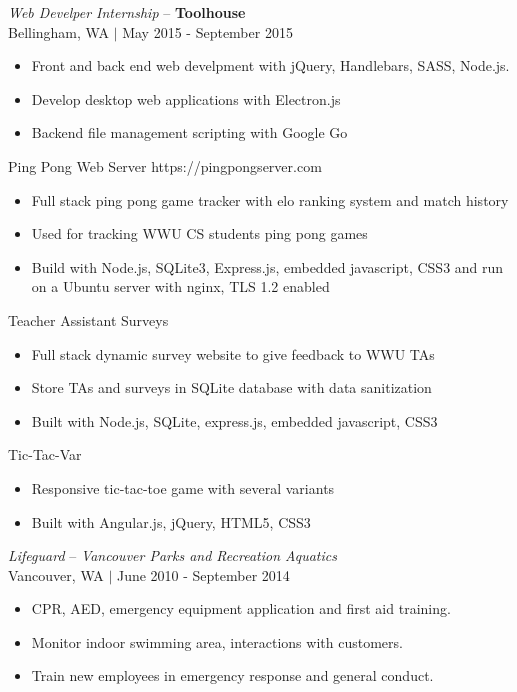 \documentclass[line,margin]{res}
\begin{document}
\begin{resume}
	{\sl Web Develper Internship} -- {\bf Toolhouse} \\
	{\footnotesize Bellingham, WA $|$  May 2015 - September 2015}
	\begin{itemize} \itemsep -2pt
		\item Front and back end web develpment with jQuery, Handlebars, SASS, Node.js.
		\item Develop desktop web applications with Electron.js
		\item Backend file management scripting with Google Go
	\end{itemize}
	Ping Pong Web Server {\footnotesize https://pingpongserver.com}
\begin{itemize}\itemsep -2pt
		\item Full stack ping pong game tracker with elo ranking system and match history
		\item Used for tracking WWU CS students ping pong games
		\item Build with Node.js, SQLite3, Express.js, embedded javascript, CSS3 and run on a Ubuntu server with nginx, TLS 1.2 enabled
	\end{itemize}
	Teacher Assistant Surveys
	\begin{itemize} \itemsep -2pt
		\item Full stack dynamic survey website to give feedback to WWU TAs
		\item Store TAs and surveys in SQLite database with data sanitization
		\item Built with Node.js, SQLite, express.js, embedded javascript, CSS3
	\end{itemize}
	Tic-Tac-Var
	\begin{itemize} \itemsep -2pt
		\item Responsive tic-tac-toe game with several variants
		\item Built with Angular.js, jQuery, HTML5, CSS3
	\end{itemize}

	{\sl Lifeguard} -- {\sl Vancouver Parks and Recreation Aquatics} \\
	{\footnotesize Vancouver, WA $|$  June 2010 - September 2014}
	\begin{itemize} \itemsep -2pt
		\item CPR, AED, emergency equipment application and first aid training.
		\item Monitor indoor swimming area, interactions with customers.
		\item Train new employees in emergency response and general conduct.
	\end{itemize}


\end{resume}
\end{document}
